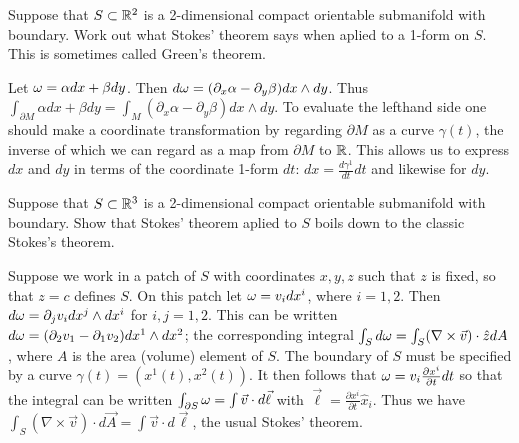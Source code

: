 \begin{p}%
{Suppose that $S\subset \mathbb{R}^2$ is a 2-dimensional compact orientable submanifold with boundary. Work out what Stokes' theorem says when aplied to a 1-form on $S$. This is sometimes called
Green's theorem.}
\end{p}
{Let $\omega=\alpha dx+\beta dy$. Then $d\omega=(\partial_x \alpha-\partial_y\beta)dx\wedge dy$. Thus $\int_{\partial M}\alpha dx+\beta dy=\int_M (\partial_x \alpha-\partial_y\beta)dx\wedge dy$. To evaluate the lefthand side one should
make a coordinate transformation by regarding $\partial M$ as a curve $\gamma(t)$, the
inverse of which we can regard as a map from $\partial M$ to $\mathbb{R}$. This allows us 
to express $dx$ and $dy$ in terms of the coordinate 1-form $dt$: $dx=\frac{d\gamma^1}{dt}dt$ and likewise for $dy$.}

\begin{p}%
{Suppose that $S\subset \mathbb{R}^3$ is a 2-dimensional compact orientable submanifold with boundary. Show that Stokes' theorem aplied to $S$ boils down to the classic Stokes's theorem.}
\end{p}
{Suppose we work in a patch of $S$ with coordinates $x,y,z$ such that $z$ is fixed, so that $z=c$ defines $S$. On this patch let $\omega=v_i dx^i$, where $i=1,2$. Then $d\omega=\partial_j v_i dx^j\wedge dx^i$ for $i,j=1,2$. This can 
be written $d\omega=(\partial_2 v_1-\partial_1 v_2)dx^1\wedge dx^2$; the corresponding integral $\int_S d\omega=\int_S (\nabla\times \vec{v})\cdot \hat{z}dA$, where $A$ is the area 
(volume) element of $S$. The boundary of $S$ must be specified by a curve $\gamma(t)=(x^1(t),x^2(t))$. It then follows that $\omega=v_i\frac{\partial x^i}{\partial t}dt$ so that the integral can be written $\int_{\partial S}\omega=\int \vec{v}\cdot d\vec{\ell}$ with $\vec{\ell}=\frac{\partial x^i}{\partial t}\hat{x}_i$. Thus we have
 $\int_S (\nabla\times \vec{v})\cdot d\vec{A}=\int \vec{v}\cdot d\vec{\ell}$, the usual Stokes' theorem.}

